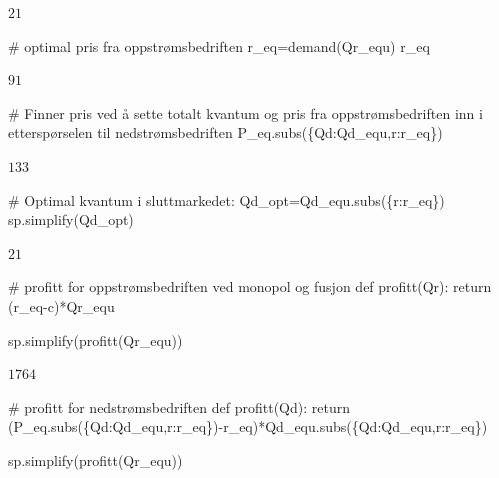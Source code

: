 \documentclass[
  12pt,
  a4paper,
  DIV=11,
  numbers=noendperiod]{scrartcl}
\newenvironment{Shaded}{\begin{snugshade}}{\end{snugshade}}
\newcommand{\CommentTok}[1]{\textcolor[rgb]{0.37,0.37,0.37}{#1}}
\newcommand{\ControlFlowTok}[1]{\textcolor[rgb]{0.00,0.23,0.31}{#1}}
\newcommand{\KeywordTok}[1]{\textcolor[rgb]{0.00,0.23,0.31}{#1}}
\newcommand{\NormalTok}[1]{\textcolor[rgb]{0.00,0.23,0.31}{#1}}
\newcommand{\OperatorTok}[1]{\textcolor[rgb]{0.37,0.37,0.37}{#1}}
\begin{document}
$\displaystyle 21$

\begin{Shaded}
\begin{Highlighting}[]
\CommentTok{\# optimal pris fra oppstrømsbedriften}
\NormalTok{r\_eq}\OperatorTok{=}\NormalTok{demand(Qr\_equ)}
\NormalTok{r\_eq}
\end{Highlighting}
\end{Shaded}

$\displaystyle 91$

\begin{Shaded}
\begin{Highlighting}[]
\CommentTok{\# Finner pris ved å sette totalt kvantum og pris fra oppstrømsbedriften inn i etterspørselen til nedstrømsbedriften}
\NormalTok{P\_eq.subs(\{Qd:Qd\_equ,r:r\_eq\})}
\end{Highlighting}
\end{Shaded}

$\displaystyle 133$

\begin{Shaded}
\begin{Highlighting}[]
\CommentTok{\# Optimal kvantum i sluttmarkedet:}
\NormalTok{Qd\_opt}\OperatorTok{=}\NormalTok{Qd\_equ.subs(\{r:r\_eq\})}
\NormalTok{sp.simplify(Qd\_opt)}
\end{Highlighting}
\end{Shaded}

$\displaystyle 21$

\begin{Shaded}
\begin{Highlighting}[]
\CommentTok{\# profitt for oppstrømsbedriften ved monopol og fusjon}
\KeywordTok{def}\NormalTok{ profitt(Qr):}
    \ControlFlowTok{return}\NormalTok{ (r\_eq}\OperatorTok{{-}}\NormalTok{c)}\OperatorTok{*}\NormalTok{Qr\_equ}

\NormalTok{sp.simplify(profitt(Qr\_equ))}
\end{Highlighting}
\end{Shaded}

$\displaystyle 1764$

\begin{Shaded}
\begin{Highlighting}[]
\CommentTok{\# profitt for nedstrømsbedriften}
\KeywordTok{def}\NormalTok{ profitt(Qd):}
    \ControlFlowTok{return}\NormalTok{ (P\_eq.subs(\{Qd:Qd\_equ,r:r\_eq\})}\OperatorTok{{-}}\NormalTok{r\_eq)}\OperatorTok{*}\NormalTok{Qd\_equ.subs(\{Qd:Qd\_equ,r:r\_eq\})}

\NormalTok{sp.simplify(profitt(Qr\_equ))}
\end{Highlighting}
\end{Shaded}
\end{document}
